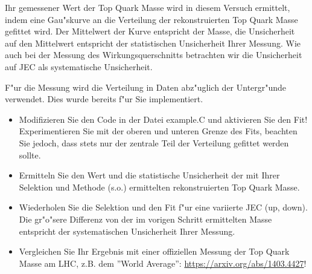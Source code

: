 Ihr gemessener Wert der Top Quark Masse wird in diesem Versuch ermittelt, indem eine Gau"skurve an die Verteilung der rekonstruierten Top Quark Masse gefittet wird. Der Mittelwert der Kurve entspricht der Masse, die Unsicherheit auf den Mittelwert entspricht der statistischen Unsicherheit Ihrer Messung. Wie auch bei der Messung des Wirkungsquerschnitts betrachten wir die Unsicherheit auf JEC als systematische Unsicherheit. 

F"ur die Messung wird die Verteilung in Daten abz"uglich der Untergr"unde verwendet. Dies wurde bereits f"ur Sie implementiert.

\begin{itemize}
\item Modifizieren Sie den Code in der Datei example.C und aktivieren Sie den Fit! Experimentieren Sie mit der oberen und unteren Grenze des Fits, beachten Sie jedoch, dass stets nur der zentrale Teil der Verteilung gefittet werden sollte.

\item Ermitteln Sie den Wert und die statistische Unsicherheit der mit Ihrer Selektion und Methode (s.o.) ermittelten rekonstruierten Top Quark Masse.

\item Wiederholen Sie die Selektion und den Fit f"ur eine variierte JEC (up, down). Die gr"o"sere Differenz von der im vorigen Schritt ermittelten Masse entspricht der systematischen Unsicherheit Ihrer Messung. 

\item Vergleichen Sie Ihr Ergebnis mit einer offiziellen Messung der Top Quark Masse am LHC, z.B. dem ''World Average'': \url{https://arxiv.org/abs/1403.4427}!
\end{itemize}